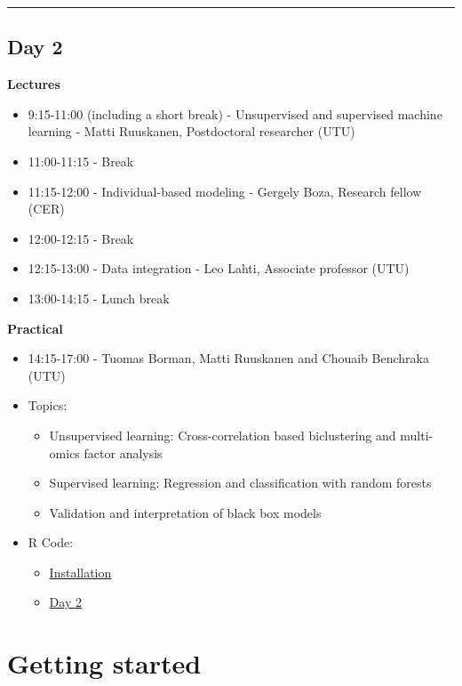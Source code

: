 \documentclass[
  oneside]{book}
\begin{document}
\begin{center}\rule{0.5\linewidth}{0.5pt}\end{center}

\hypertarget{day-2}{%
\section{Day 2}\label{day-2}}

\textbf{Lectures}

\begin{itemize}
\item
  9:15-11:00 (including a short break) - Unsupervised and supervised machine learning - Matti Ruuskanen, Postdoctoral researcher (UTU)
\item
  11:00-11:15 - Break
\item
  11:15-12:00 - Individual-based modeling - Gergely Boza, Research fellow (CER)
\item
  12:00-12:15 - Break
\item
  12:15-13:00 - Data integration - Leo Lahti, Associate professor (UTU)
\item
  13:00-14:15 - Lunch break
\end{itemize}

\textbf{Practical}

\begin{itemize}
\item
  14:15-17:00 - Tuomas Borman, Matti Ruuskanen and Chouaib Benchraka (UTU)
\item
  Topics:

  \begin{itemize}
  \item
    Unsupervised learning: Cross-correlation based biclustering and multi-omics factor analysis
  \item
    Supervised learning: Regression and classification with random forests
  \item
    Validation and interpretation of black box models
  \end{itemize}
\item
  R Code:

  \begin{itemize}
  \item
    \href{install_script.R}{Installation}
  \item
    \href{Day_2.R}{Day 2}
  \end{itemize}
\end{itemize}

\hypertarget{getting-started}{%
\chapter{Getting started}\label{getting-started}}
\end{document}
